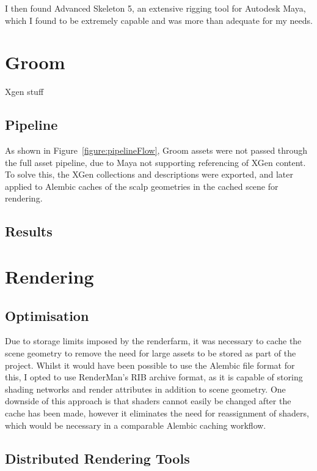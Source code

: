 \documentclass[11pt]{article}
\begin{document}
I then found Advanced Skeleton 5\cite{advancedSkeleton}, an extensive rigging tool for Autodesk Maya, which I found to be extremely capable and was more than adequate for my needs.

\section{Groom}

Xgen stuff

\subsection{Pipeline}

As shown in Figure~\ref{figure:pipelineFlow}, Groom assets were not passed through the full asset pipeline, due to Maya not supporting referencing of XGen content. To solve this, the XGen collections and descriptions were exported, and later applied to Alembic caches of the scalp geometries in the cached scene for rendering.

\subsection{Results}

\section{Rendering}

\subsection{Optimisation}

Due to storage limits imposed by the renderfarm, it was necessary to cache the scene geometry to remove the need for large assets to be stored as part of the project. Whilst it would have been possible to use the Alembic file format for this, I opted to use RenderMan's RIB archive format, as it is capable of storing shading networks and render attributes in addition to scene geometry. One downside of this approach is that shaders cannot easily be changed after the cache has been made, however it eliminates the need for reassignment of shaders, which would be necessary in a comparable Alembic caching workflow.

\subsection{Distributed Rendering Tools}
\end{document}
